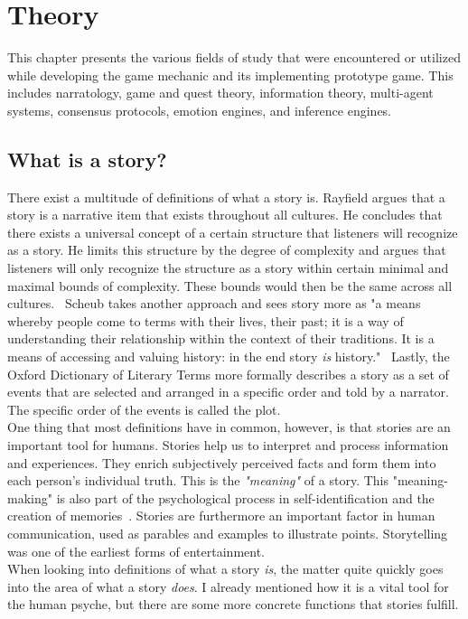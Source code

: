 \chapter{Theory} %
This chapter presents the various fields of study that were encountered or utilized while developing the game mechanic and its implementing prototype game. This includes narratology, game and quest theory, information theory, multi-agent systems, consensus protocols, emotion engines, and inference engines.
\section{What is a story?}
There exist a multitude of definitions of what a story is. Rayfield argues that a story is a narrative item that exists throughout all cultures. He concludes that there exists a universal concept of a certain structure that listeners will recognize as a story. He limits this structure by the degree of complexity and argues that listeners will only recognize the structure as a story within certain minimal and maximal bounds of complexity. These bounds would then be the same across all cultures.~\cite{Rayfield1972} Scheub takes another approach and sees story more as "a means whereby people come to terms with their lives, their past; it is a way of understanding their relationship within the context of their traditions. It is a means of accessing and valuing history: in the end story \textit{is} history."~\cite{Scheub1998} Lastly, the Oxford Dictionary of Literary Terms more formally describes a story as a set of events that are selected and arranged in a specific order and told by a narrator. The specific order of the events is called the plot.~\cite{Baldick1996}\\
One thing that most definitions have in common, however, is that stories are an important tool for humans. Stories help us to interpret and process information and experiences. They enrich subjectively perceived facts and form them into each person's individual truth. This is the \textit{"meaning"} of a story. This "meaning-making" is also part of the psychological process in self-identification and the creation of memories~\cite{Flanagan1992}. Stories are furthermore an important factor in human communication, used as parables and examples to illustrate points. Storytelling was one of the earliest forms of entertainment.\\
When looking into definitions of what a story \textit{is}, the matter quite quickly goes into the area of what a story \textit{does}. I already mentioned how it is a vital tool for the human psyche, but there are some more concrete functions that stories fulfill.
